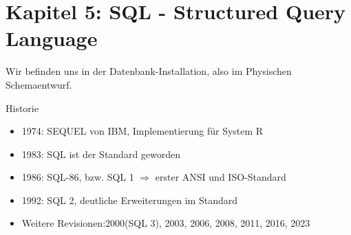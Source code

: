 \documentclass{article}
\begin{document}
\section{Kapitel 5: SQL - Structured Query Language}

Wir befinden uns in der Datenbank-Installation, also im Physischen Schemaentwurf.

\begin{block}{Historie}
  \begin{itemize}
    \item 1974: SEQUEL von IBM, Implementierung für System R
    \item 1983: SQL ist der Standard geworden
    \item 1986: SQL-86, bzw. SQL 1 $\Rightarrow$ erster ANSI und ISO-Standard
    \item 1992: SQL 2, deutliche Erweiterungen im Standard
    \item Weitere Revisionen:2000(SQL 3), 2003, 2006, 2008, 2011, 2016, 2023
  \end{itemize}
\end{block}
\end{document}
